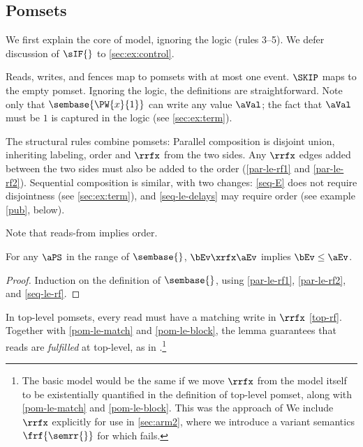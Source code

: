 \subsection{Pomsets}
\label{sec:ex:pomset}

We first explain the core of model, ignoring the logic (rules 3--5).
We defer discussion of $\sIF{}$ to \textsection\ref{sec:ex:control}.

Reads, writes, and fences map to pomsets with at most one event.  $\SKIP$
maps to the empty pomset.  Ignoring the logic, the definitions are
straightforward.  Note only that $\sembase{\PW{x}{1}}$ can write any value
$\aVal$; the fact that $\aVal$ must be $1$ is captured in the logic (see
\textsection\ref{sec:ex:term}).

The structural rules combine pomsets:  Parallel composition is disjoint
union, inheriting labeling, order and $\rrfx$ from the two sides.  Any
$\rrfx$ edges added between the two sides must also be added to the order
(\ref{par-le-rf1} and \ref{par-le-rf2}).
% 
Sequential composition is similar, with two changes: \ref{seq-E} does not
require disjointness (see \textsection\ref{sec:ex:term}), and
\ref{seq-le-delays} may require order (see example \ref{pub}, below).

Note that reads-from implies order.
\begin{lemma}
  \label{lem:rf:implies:le}
  For any $\aPS$ in the range of $\sembase{}$, $\bEv\xrfx\aEv$ implies
  $\bEv\le\aEv$.

  \vspace{-.5\baselineskip}
  \begin{proof}
    Induction on the definition of $\sembase{}$, using \ref{par-le-rf1}, \ref{par-le-rf2}, and \ref{seq-le-rf}.
  \end{proof}
\end{lemma}
In top-level pomsets, every read must have a matching write in $\rrfx$
\eqref{top-rf}.  Together with \ref{pom-le-match} and \ref{pom-le-block}, the lemma
guarantees that reads are \emph{fulfilled} at top-level, as in
\cite[]{DBLP:journals/pacmpl/JagadeesanJR20}.\footnote{The
  basic model would be the same if we move $\rrfx$ from the model itself to
  be existentially quantified in the definition of top-level pomset, along
  with \ref{pom-le-match} and \ref{pom-le-block}.  This was the approach of
  \citeauthor{DBLP:journals/pacmpl/JagadeesanJR20} We include $\rrfx$
  explicitly for use in \textsection\ref{sec:arm2}, where we introduce a
  variant semantics $\frf{\semrr{}}$ for which 
  fails.}

